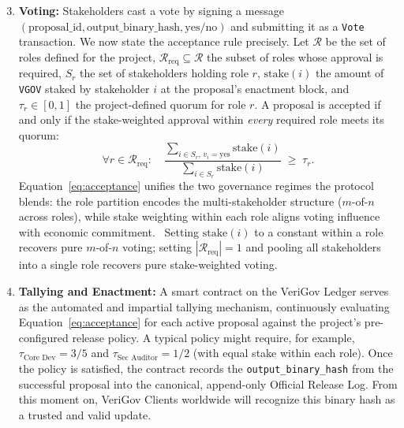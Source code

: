 \documentclass{article}
\begin{document}
\begin{enumerate}\setcounter{enumi}{2}
\item \textbf{Voting:} Stakeholders cast a vote by signing a message $(\text{proposal\_id}, \text{output\_binary\_hash}, \text{yes/no})$ and submitting it as a \texttt{Vote} transaction. We now state the acceptance rule precisely. Let $\mathcal{R}$ be the set of roles defined for the project, $\mathcal{R}_{\text{req}} \subseteq \mathcal{R}$ the subset of roles whose approval is required, $S_r$ the set of stakeholders holding role $r$, $\text{stake}(i)$ the amount of \texttt{VGOV} staked by stakeholder $i$ at the proposal's enactment block, and $\tau_r \in [0,1]$ the project-defined quorum for role $r$. A proposal is accepted if and only if the stake-weighted approval within \emph{every} required role meets its quorum:
\begin{equation}
\forall r \in \mathcal{R}_{\text{req}}: \quad \frac{\sum_{i \in S_r,\, v_i = \text{yes}} \text{stake}(i)}{\sum_{i \in S_r} \text{stake}(i)} \;\geq\; \tau_r.
\label{eq:acceptance}
\end{equation}
Equation~\ref{eq:acceptance} unifies the two governance regimes the protocol blends: the role partition encodes the multi-stakeholder structure ($m$-of-$n$ across roles), while stake weighting within each role aligns voting influence with economic commitment.~\cite{lalley2018qv} Setting $\text{stake}(i)$ to a constant within a role recovers pure $m$-of-$n$ voting; setting $|\mathcal{R}_{\text{req}}|=1$ and pooling all stakeholders into a single role recovers pure stake-weighted voting.

\item \textbf{Tallying and Enactment:} A smart contract on the VeriGov Ledger serves as the automated and impartial tallying mechanism, continuously evaluating Equation~\ref{eq:acceptance} for each active proposal against the project's pre-configured release policy. A typical policy might require, for example, $\tau_{\text{Core Dev}} = 3/5$ and $\tau_{\text{Sec Auditor}} = 1/2$ (with equal stake within each role). Once the policy is satisfied, the contract records the \texttt{output\_binary\_hash} from the successful proposal into the canonical, append-only Official Release Log. From this moment on, VeriGov Clients worldwide will recognize this binary hash as a trusted and valid update.
\end{enumerate}
\end{document}
